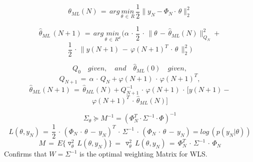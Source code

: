 \begin{tcolorbox}[colback=yellow!5!white,colframe=yellow!75!white,coltitle=black,title=\textbf{Recursive Linear Least Squares}]
\begin{equation*}
\theta _{ ML }(N) \, = \, arg\, \underset { \theta \, \in \, { R } }{ min } \, \frac { 1 }{ 2 } \parallel y_N - \Phi_N\cdot\,\theta{ \parallel  }_{ 2 }^{ 2 }
\end{equation*}

\begin{equation*}
\hat { \theta  } _{ ML }\, (N+1)\, =\, arg\, \underset { \theta \, \in \, { R^{ d } } }{ min } \, (\alpha \, \cdot \, \frac { 1 }{ 2 } \, \cdot \, \parallel \theta \, - \, \hat { \theta  } _{ ML }(N){ \parallel  }_{ Q_{ N } }^{ 2 }+
\end{equation*}
\begin{equation*}
\frac { 1 }{ 2 } \, \cdot \, \parallel y(N+1) \, - \, \varphi (N+1)^{ T }\, \cdot \, \theta \, { \parallel  }_{ 2 }^{ 2 })
\end{equation*}

\begin{equation*}
Q_{ 0 }\quad given,\quad and\quad \hat { \theta  } _{ ML }(0)\quad given,
\end{equation*}
\begin{equation*}
Q_{ N+1 }\, =\, \alpha \, \cdot \, Q_{ N }+\varphi (N+1)\, \cdot \, \varphi (N+1)^{ T },
\end{equation*}
\begin{equation*}
\hat { \theta  } _{ ML }(N+1)\, =\, \hat { \theta  } _{ ML }(N)+Q_{ N+1 }^{ -1 }\, \cdot \, \varphi (N+1)\, \cdot \, [y(N+1)-
\end{equation*}
\begin{equation*}
\varphi(N+1)^T \, \cdot \,\hat{\theta}_{ML}(N)]
\end{equation*}
\end{tcolorbox}

\begin{tcolorbox}[colback=yellow!5!white,colframe=yellow!75!white,coltitle=black,title=\textbf{Cramer-Rao-Inequality (Fisher information Matrix M)}]
\begin{equation*}
{ \Sigma  }_{ \theta  } \succeq M^{-1} = (\Phi^T_N \cdot \Sigma^{-1} \cdot \Phi)^{-1}
\end{equation*}
\begin{equation*}
L(\theta ,y_{ N })\, =\, \frac { 1 }{ 2 } \, \cdot \, (\Phi _{ N }\, \cdot \, \theta \, -\, y_N)^{ T } \, \cdot \, \Sigma^{-1} \, \cdot \,  (\Phi_N \, \cdot \, \theta \, - \, y_N) =log\, (p({ y }_{ N }|\theta))
\end{equation*}
\begin{equation*}
M\, =\, { E }\{ \triangledown ^{ 2 }_{ \theta  }\, L(\theta ,y_{ N })\} \, =\, \triangledown ^{ 2 }_{ \theta  }\, L(\theta ,y_{ N })\, =\, \Phi _{ N }^{ T }\, \cdot \, \Sigma ^{ -1 }\, \cdot \, \Phi _{ N }
\end{equation*}
Confirms that $W = \Sigma^{-1}$ is the optimal weighting Matrix for WLS.
\end{tcolorbox}